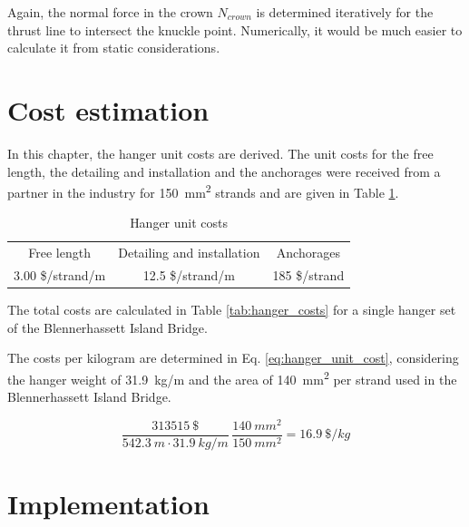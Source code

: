 Again, the normal force in the crown $N_{crown}$ is determined iteratively for the thrust line to intersect the knuckle point. Numerically, it would be much easier to calculate it from static considerations.

\section{Cost estimation}
In this chapter, the hanger unit costs are derived. The unit costs for the free length, the detailing and installation and the anchorages were received from a partner in the industry for \SI{150}{mm^2} strands and are given in Table \ref{tab:hanger_unit}.

\begin{table}[H]
\centering
\begin{tabular}{ccc}
\hline
Free length      & Detailing and installation & Anchorages    \\
3.00 \$/strand/m & 12.5 \$/strand/m           & 185 \$/strand \\ \hline
\end{tabular}
\caption{Hanger unit costs}
\label{tab:hanger_unit}
\end{table}

The total costs are calculated in Table \ref{tab:hanger_costs} for a single hanger set of the Blennerhassett Island Bridge. 



The costs per kilogram are determined in Eq. \ref{eq:hanger_unit_cost}, considering the hanger weight of \SI{31.9}{kg/m} and the area of \SI{140}{mm^2} per strand used in the Blennerhassett Island Bridge.

\begin{equation}
    \frac{\SI{313515}{\$}}{\SI{542.3}{m} \cdot \SI{31.9}{kg/m}} \, \frac{\SI{140}{mm^2}}{\SI{150}{mm^2}}= \SI{16.9}{\$/kg}
    \label{eq:hanger_unit_cost}
\end{equation}

\newpage
\section{Implementation}

